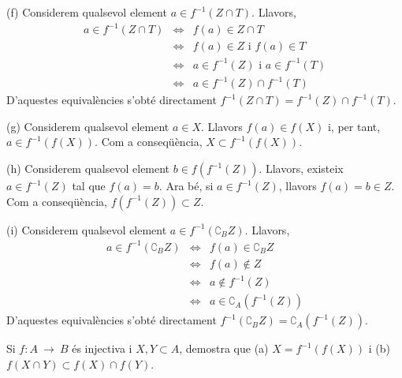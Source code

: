 \begin{solucio}
(f) Considerem qualsevol element $a\in f^{-1}(Z\cap T)$. Llavors,%
\begin{equation*}
\begin{array}{lll}
a\in f^{-1}(Z\cap T) & \Longleftrightarrow & f(a)\in Z\cap T \\
& \Longleftrightarrow & f(a)\in Z\text{ \ i \ }f(a)\in T \\
& \Longleftrightarrow & a\in f^{-1}(Z)\text{ \ i \ }a\in f^{-1}(T) \\
& \Longleftrightarrow & a\in f^{-1}(Z)\cap f^{-1}(T)%
\end{array}%
\end{equation*}%
D'aquestes equival\`{e}ncies s'obt\'{e} directament $f^{-1}(Z\cap
T)=f^{-1}(Z)\cap f^{-1}(T)$.

(g) Considerem qualsevol element $a\in X$. Llavors $f(a)\in f(X)$ i, per
tant, $a\in f^{-1}\left( f(X)\right) $. Com a conseq\"{u}\`{e}ncia, $%
X\subset f^{-1}\left( f(X)\right) $.

(h) Considerem qualsevol element $b\in f\left( f^{-1}(Z)\right) $. Llavors,
existeix $a\in f^{-1}(Z)$ tal que $f(a)=b$. Ara b\'{e}, si $a\in f^{-1}(Z)$,
llavors $f(a)=b\in Z$. Com a conseq\"{u}\`{e}ncia, $f\left( f^{-1}(Z)\right)
\subset Z$.

(i) Considerem qualsevol element $a\in f^{-1}\left( \complement _{B}Z\right)
$. Llavors,%
\begin{equation*}
\begin{array}{lll}
a\in f^{-1}\left( \complement _{B}Z\right) & \Longleftrightarrow & f(a)\in
\complement _{B}Z \\
& \Longleftrightarrow & f(a)\notin Z \\
& \Longleftrightarrow & a\notin f^{-1}(Z) \\
& \Longleftrightarrow & a\in \complement _{A}\left( f^{-1}(Z)\right)%
\end{array}%
\end{equation*}%
D'aquestes equival\`{e}ncies s'obt\'{e} directament $f^{-1}\left(
\complement _{B}Z\right) =\complement _{A}\left( f^{-1}(Z)\right) $.
\end{solucio}

\begin{exer}
Si $f:A~\longrightarrow ~B$ \'{e}s injectiva i $X,Y\subset A$, demostra que
(a) $X=f^{-1}\left( f(X)\right) $ i (b) $f(X\cap Y)\subset f(X)\cap f(Y)$.
\end{exer}

